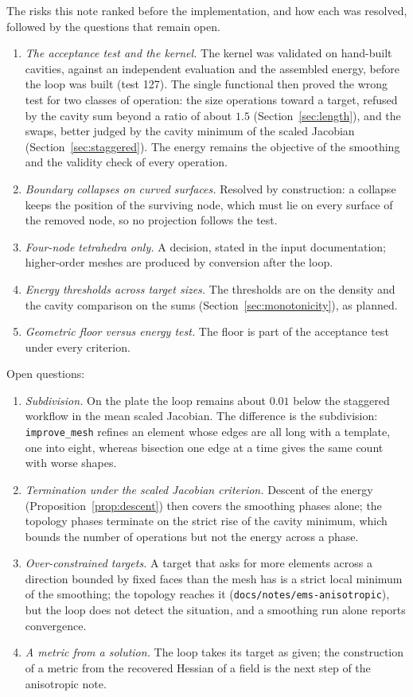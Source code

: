 \documentclass[11pt]{article}
\newcommand{\code}[1]{\texttt{#1}}
\begin{document}
The risks this note ranked before the implementation, and how each was
resolved, followed by the questions that remain open.

\begin{enumerate}[itemsep=2pt]
\item \emph{The acceptance test and the kernel.} The kernel was
  validated on hand-built cavities, against an independent evaluation
  and the assembled energy, before the loop was built (test 127). The
  single functional then proved the wrong test for two classes of
  operation: the size operations toward a target, refused by the cavity
  sum beyond a ratio of about $1.5$ (Section~\ref{sec:length}), and the
  swaps, better judged by the cavity minimum of the scaled Jacobian
  (Section~\ref{sec:staggered}). The energy remains the objective of the
  smoothing and the validity check of every operation.
\item \emph{Boundary collapses on curved surfaces.} Resolved by
  construction: a collapse keeps the position of the surviving node,
  which must lie on every surface of the removed node, so no projection
  follows the test.
\item \emph{Four-node tetrahedra only.} A decision, stated in the input
  documentation; higher-order meshes are produced by conversion after
  the loop.
\item \emph{Energy thresholds across target sizes.} The thresholds are
  on the density and the cavity comparison on the sums
  (Section~\ref{sec:monotonicity}), as planned.
\item \emph{Geometric floor versus energy test.} The floor is part of the
  acceptance test under every criterion.
\end{enumerate}

Open questions:
\begin{enumerate}[itemsep=2pt]
\item \emph{Subdivision.} On the plate the loop remains about $0.01$
  below the staggered workflow in the mean scaled Jacobian. The
  difference is the subdivision: \code{improve\_mesh} refines an element
  whose edges are all long with a template, one into eight, whereas
  bisection one edge at a time gives the same count with worse shapes.
\item \emph{Termination under the scaled Jacobian criterion.} Descent of
  the energy (Proposition~\ref{prop:descent}) then covers the smoothing
  phases alone; the topology phases terminate on the strict rise of the
  cavity minimum, which bounds the number of operations but not the
  energy across a phase.
\item \emph{Over-constrained targets.} A target that asks for more
  elements across a direction bounded by fixed faces than the mesh has is
  a strict local minimum of the smoothing; the topology reaches it
  (\code{docs/notes/ems-anisotropic}), but the loop does not detect the
  situation, and a smoothing run alone reports convergence.
\item \emph{A metric from a solution.} The loop takes its target as
  given; the construction of a metric from the recovered Hessian of a
  field is the next step of the anisotropic note.
\end{enumerate}
\end{document}
